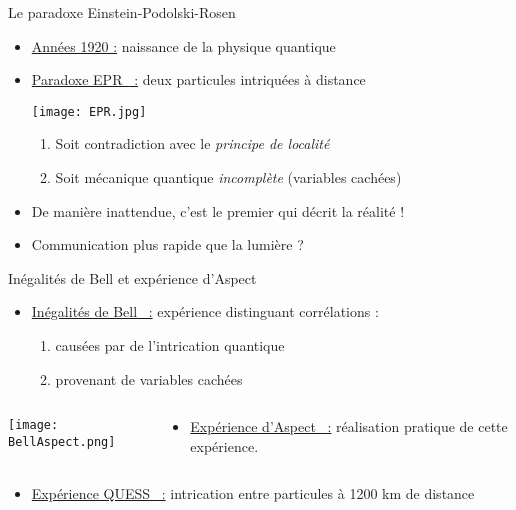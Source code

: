 \documentclass{beamer}
\theoremstyle{definition}
\theoremstyle{remark}
\begin{document}
\begin{frame}{Le paradoxe Einstein-Podolski-Rosen}

  \begin{itemize}
  \item \underline{Années 1920 :} naissance de la physique quantique
    \pause
    \bigskip
  \item \underline{Paradoxe EPR~\cite{EPR35} :} deux particules intriquées à distance
    \begin{center}
      \texttt{[image: EPR.jpg]}
    \end{center}
    \pause
    \begin{enumerate}
    \item Soit contradiction avec le \emph{principe de localité}
    \item Soit mécanique quantique \emph{incomplète} (variables cachées)
    \end{enumerate}
    \pause
  \item De manière inattendue, c'est \alert{le premier} qui décrit la réalité !
  \item Communication plus rapide que la lumière ? 
  \end{itemize}
\end{frame}

\begin{frame}{Inégalités de Bell et expérience d'Aspect}
  \begin{itemize}
  \item \underline{Inégalités de Bell~\cite{Bell64} :} expérience distinguant corrélations :\begin{enumerate}
    \item causées par de l'intrication quantique
    \item provenant de variables cachées
  \end{enumerate}
  \end{itemize}
  \pause
  \begin{columns}
    \begin{column}{2cm}
      \texttt{[image: BellAspect.png]}
    \end{column}
    \begin{column}{6cm}
      \begin{itemize}
      \item \underline{Expérience d'Aspect~\cite{ADG82} :} réalisation pratique de cette expérience.
      \end{itemize}
    \end{column}
    \end{columns}
    \pause
    \bigskip
    \begin{itemize}
  \item \underline{Expérience QUESS~\cite{Yin17} :} intrication entre particules à 1200 km de distance
  \end{itemize}
\end{frame}
\end{document}
